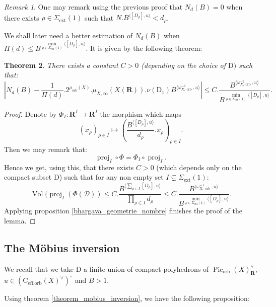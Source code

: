 \documentclass{proc-l}
\newcommand{\R}{\mathbf{R}}
\newcommand{\coneorb}{\text{C}_{\text{eff},\text{orb}}(X)}
\DeclareMathOperator{\Pic}{Pic}
\DeclareMathOperator{\proj}{proj}
\DeclareMathOperator{\Vol}{Vol}
\DeclareMathOperator{\orb}{orb}
\DeclareMathOperator{\ext}{ext}
\newcommand{\w}{\omega}
\newtheorem{theorem}{Theorem}[section]
\theoremstyle{definition}
\theoremstyle{remark}
\newtheorem{remark}[theorem]{Remark}
\numberwithin{equation}{section}
\begin{document}
\begin{remark}\label{remark_nulitte_N_d(B)}
    One may remark using the previous proof that $N_d(B) = 0$ when there exists $\rho \in \Sigma_{\ext}(1)$ such that $N . B^{\langle [D_{\rho}] , u \rangle} < d_{\rho}$.
\end{remark}

We shall later need a better estimation of $N_d(B)$ when $\Pi(d) \leqslant B^{\min\limits_{\rho \in \Sigma_{\ext}(1)} \langle [D_{\rho}] , u \rangle}$. It is given by the following theorem:


\begin{theorem}\label{estimation_N_d(B)}
    There exists a constant $C > 0$ (depending on the choice of $\mathrm{D})$ such that:
    $$\left|  N_d(B) - \frac{1}{\Pi(d)}.2^{\rho_{\orb}(X)}.\mu_{X,\infty}(X(\R)). \nu(\mathrm{D}_1) B^{ \langle \w_{X,\orb}^{-1} , u \rangle } \right| \leqslant C .\frac{B^{\langle \w_{X,\orb}^{-1},u\rangle}}{B^{ \min\limits_{\rho \in \Sigma_{\ext}(1)} \langle [D_{\rho}],u\rangle } } .$$
\end{theorem}

\begin{proof}
    Denote by $\Phi_I : \R^I \rightarrow \R^I$ the morphism which maps $$(x_{\rho})_{\rho \in I} \mapsto ( \frac{B^{\langle [D_{\rho}] , u \rangle}}{d_{\rho}} . x_{\rho} )_{\rho \in I} .$$Then we may remark that:
  $$ \proj_I \circ \Phi = \Phi_I \circ \proj_I .$$Hence we get, using this, that there exists $C > 0$ (which depends only on the compact subset $\mathrm{D}$) such that for any non empty set $I \subsetneq \Sigma_{\ext}(1) $:
   $$ \Vol(\proj_I(\Phi(\mathcal{D})) \leqslant C . \frac{B^{\langle \sum\limits_{\rho \in I} [D_{\rho}] , u \rangle}}{\prod\limits_{ \rho \in I} d_{\rho}} \leqslant C.\frac{B^{\langle \w_{X,\orb}^{-1},u\rangle}}{B^{ \min\limits_{\rho \in \Sigma_{\ext}(1)} \langle [D_{\rho}],u\rangle } }.$$Applying proposition \ref{bhargava_geometrie_nombre} finishes the proof of the lemma.
   
\end{proof}


\subsection{The Möbius inversion}


We recall that we take $\mathrm{D}$ a finite union of compact polyhedrons of $\Pic_{\orb}(X)^{\vee}_{\R}$, $u \in (\coneorb^{\vee})^{\circ}$ and $B > 1$.

Using theorem \ref{theorem_mobius_inversion}, we have the following proposition:
\end{document}
